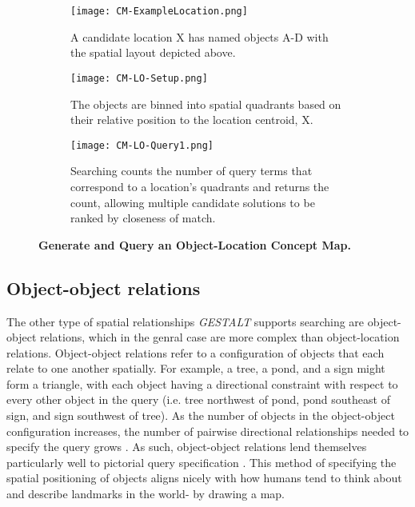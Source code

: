\begin{figure*}[h]
    \centering
    \begin{subfigure}[t]{.3\textwidth}
        \texttt{[image: CM-ExampleLocation.png]}
        \caption{\small A candidate location X has named objects A-D with the spatial layout depicted above.} 
        \label{fig:CM-LO-Example}
    \end{subfigure}
    \hfill
    \begin{subfigure}[t]{.3\textwidth}
        \texttt{[image: CM-LO-Setup.png]}
        \caption{\small The objects are binned into spatial quadrants based on their relative position to the location centroid, X.} 
        \label{fig:CM-LO-Setup}
    \end{subfigure}
    \hfill
        \begin{subfigure}[t]{.3\textwidth}
        \texttt{[image: CM-LO-Query1.png]}
        \caption{\small Searching counts the number of query terms that correspond to a location's quadrants and returns the count, allowing multiple candidate solutions to be ranked by closeness of match.}
        \label{fig:CM-LO-Query}
    \hfill
    \end{subfigure}
    \caption{\textbf{Generate and Query an Object-Location Concept Map.}}\label{figure:ConceptMap-LO} 
\end{figure*}



\subsection{Object-object relations}

The other type of spatial relationships \emph{GESTALT} supports searching are object-object relations, which in the genral case are more complex than object-location relations.
Object-object relations refer to a configuration of objects that each relate to one another spatially.
For example, a tree, a pond, and a sign might form a triangle, with each object having a directional constraint with respect to every other object in the query (i.e. tree northwest of pond, pond southeast of sign, and sign southwest of tree).
As the number of objects in the object-object configuration increases, the number of pairwise directional relationships needed to specify the query grows  .
As such, object-object relations lend themselves particularly well to pictorial query specification .
This method of specifying the spatial positioning of objects aligns nicely with how humans tend to think about and describe landmarks in the world- by drawing a map. 

